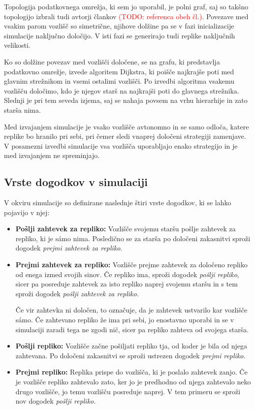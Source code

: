 \documentclass[a4paper, 12pt]{book}
\newcommand{\TODO}[1]{\textcolor{red}{(TODO: #1)}}
\begin{document}
Topologija podatkovnega omrežja, ki sem jo uporabil, je polni graf, saj so
takšno topologijo izbrali tudi avtorji člankov \TODO{referenca obeh čl.}.
Povezave med vsakim parom vozlišč so simetrične, njihove dolžine pa se v fazi
inicializacije simulacije naključno določijo. V isti fazi se generirajo tudi
replike naključnih velikosti.

Ko so dolžine povezav med vozlišči določene, se na grafu, ki predstavlja
podatkovno omrežje, izvede algoritem Dijkstra, ki poišče najkrajše poti med
glavnim strežnikom in vsemi ostalimi vozlišči. Po izvedbi algoritma vsakemu
vozlišču določimo, kdo je njegov starš na najkrajši poti do glavnega strežnika.
Slednji je pri tem seveda izjema, saj se nahaja povsem na vrhu hierarhije in
zato starša nima.

Med izvajanjem simulacije je vsako vozlišče avtonomno in se samo odloča, katere
replike bo hranilo pri sebi, pri čemer sledi vnaprej določeni strategiji
zamenjave. V posamezni izvedbi simulacije vsa vozlišča uporabljajo enako
strategijo in je med izvajanjem ne spreminjajo.

\subsection{Vrste dogodkov v simulaciji}
V okviru simulacije so definirane naslednje štiri vrste dogodkov, ki se lahko
pojavijo v njej:
\begin{itemize}
  \item \textbf{Pošlji zahtevek za repliko:} Vozlišče svojemu staršu pošlje
  zahtevek za repliko, ki je sámo nima. Posledično se za starša po določeni
  zakasnitvi sproži dogodek \textit{prejmi zahtevek za repliko}.

  \item \textbf{Prejmi zahtevek za repliko:} Vozlišče prejme zahtevek za
  določeno repliko od enega izmed svojih sinov. Če repliko ima, sproži dogodek
  \textit{pošlji repliko}, sicer pa posreduje zahtevek za isto repliko
  naprej svojemu staršu in s tem sproži dogodek \textit{pošlji zahtevek za
  repliko}.

  Če vir zahtevka ni določen, to označuje, da je zahtevek ustvarilo kar
  vozlišče sámo. Če zahtevano repliko že ima pri sebi, jo enostavno
  uporabi in se v simulaciji zaradi tega ne zgodi nič, sicer pa repliko
  zahteva od svojega starša.

  \item \textbf{Pošlji repliko:} Vozlišče začne pošiljati repliko tja, od
  koder je bila od njega zahtevana. Po določeni zakasnitvi se sproži ustrezen
  dogodek \textit{prejmi repliko}.

  \item \textbf{Prejmi repliko:} Replika prispe do vozlišča, ki je poslalo
  zahtevek zanjo. Če je vozlišče repliko zahtevalo zato, ker jo je predhodno
  od njega zahtevalo neko drugo vozlišče, jo temu vozlišču posreduje naprej.
  V tem primeru se sproži nov dogodek \textit{pošlji repliko}.
\end{itemize}
\end{document}
